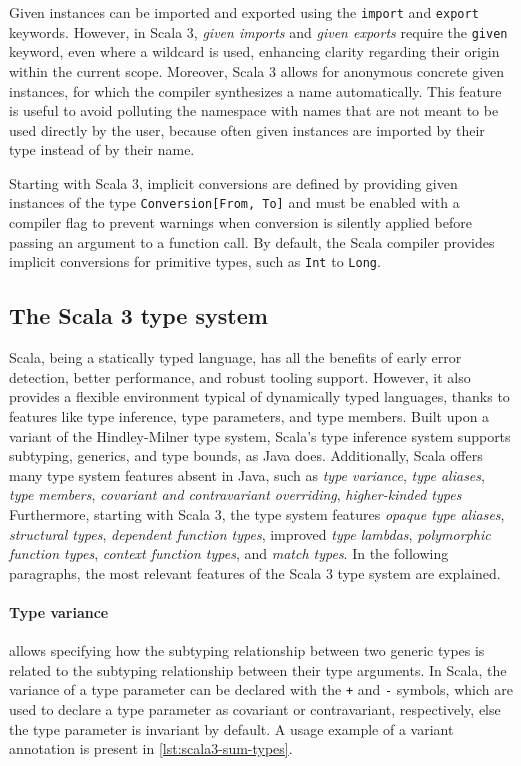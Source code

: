 Given instances can be imported and exported using the \texttt{import} and \texttt{export} keywords.
%
However, in Scala 3, \textit{given imports} and \textit{given exports} require the \texttt{given} keyword, even where a wildcard is used, enhancing clarity regarding their origin within the current scope.
%
Moreover, Scala 3 allows for anonymous concrete given instances, for which the compiler synthesizes a name automatically.
%
This feature is useful to avoid polluting the namespace with names that are not meant to be used directly by the user, because often given instances are imported by their type instead of by their name.

Starting with Scala 3, implicit conversions are defined by providing given instances of the type \texttt{Conversion[From, To]} and must be enabled with a compiler flag to prevent warnings when conversion is silently applied before passing an argument to a function call.
%
By default, the Scala compiler provides implicit conversions for primitive types, such as \texttt{Int} to \texttt{Long}.


\subsection{The Scala 3 type system} \label{chap:background->sec:scala3->subsec:type-system}

Scala, being a statically typed language, has all the benefits of early error detection, better performance, and robust tooling support.
%
However, it also provides a flexible environment typical of dynamically typed languages, thanks to features like type inference, type parameters, and type members.
%
Built upon a variant of the Hindley-Milner type system, Scala's type inference system supports subtyping, generics, and type bounds, as Java does.
%
Additionally, Scala offers many type system features absent in Java, such as \textit{type variance}, \textit{type aliases}, \textit{type members}, \textit{covariant and contravariant overriding}, \textit{higher-kinded types}
%
Furthermore, starting with Scala 3, the type system features \textit{opaque type aliases}, \textit{structural types}, \textit{dependent function types}, improved \textit{type lambdas}, \textit{polymorphic function types}, \textit{context function types}, and \textit{match types}.
%
In the following paragraphs, the most relevant features of the Scala 3 type system are explained.

\paragraph{Type variance} allows specifying how the subtyping relationship between two generic types is related to the subtyping relationship between their type arguments.
%
In Scala, the variance of a type parameter can be declared with the \texttt{+} and \texttt{-} symbols, which are used to declare a type parameter as covariant or contravariant, respectively, else the type parameter is invariant by default.
%
A usage example of a variant annotation is present in \cref{lst:scala3-sum-types}.

